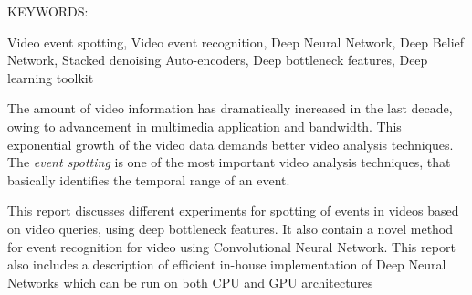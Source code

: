 \abstract

\noindent KEYWORDS: \hspace*{0.5em} \parbox[t]{4.4in}{Video event spotting, Video event recognition, Deep Neural Network, Deep Belief Network, Stacked denoising Auto-encoders, Deep bottleneck features, Deep learning toolkit }

\vspace*{24pt}

The amount of video information has dramatically increased in the last decade, owing to advancement in multimedia application and bandwidth. This exponential growth of the video data demands better video analysis techniques. The \textit{event spotting} is one of the most important video analysis techniques, that basically identifies the temporal range of an event.

This report discusses different experiments for spotting of events in videos based on video queries, using deep bottleneck features. It also contain a novel method for event recognition for video using Convolutional Neural Network. This report also includes a description of efficient in-house implementation of Deep Neural Networks which can be run on both CPU and GPU architectures
\pagebreak